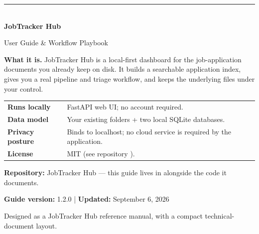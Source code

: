 \documentclass[11pt]{article}
\newcommand{\file}[1]{\texttt{\detokenize{#1}}}
\begin{document}
\begin{titlepage}
\thispagestyle{empty}
\vspace*{1.4cm}
{\color{accent}\rule{\textwidth}{2pt}}\\[1.2cm]
{\fontsize{32}{36}\selectfont\bfseries\color{ink} JobTracker Hub}\par
\vspace{0.25cm}
{\Large\color{muted} User Guide \& Workflow Playbook}\par
\vspace{1.0cm}
\begin{infobox}
\textbf{What it is.} JobTracker Hub is a local-first dashboard for the job-application documents you already keep on disk. It builds a searchable application index, gives you a real pipeline and triage workflow, and keeps the underlying files under your control.
\end{infobox}
\vspace{0.9cm}
\begin{tabularx}{\textwidth}{@{}>{\bfseries}lX@{}}
Runs locally & FastAPI web UI; no account required.\\
Data model & Your existing folders + two local SQLite databases.\\
Privacy posture & Binds to localhost; no cloud service is required by the application.\\
License & MIT (see repository \file{LICENSE}).
\end{tabularx}
\vfill
\textbf{Repository:} JobTracker Hub — this guide lives in \file{docs/} alongside the code it documents.\par
\textbf{Guide version:} 1.2.0 \quad | \quad \textbf{Updated:} September 6, 2026\par
\vspace{0.6cm}
{\small\color{muted} Designed as a JobTracker Hub reference manual, with a compact technical-document layout.}
\end{titlepage}

\setcounter{tocdepth}{1}
\tableofcontents
\end{document}
